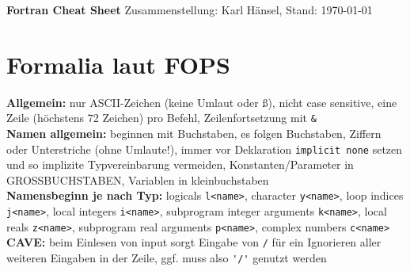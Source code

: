 \documentclass[a4paper, twocolumn]{scrarticle}
\begin{document}
  
  {\Huge \textbf{\textsf{Fortran Cheat Sheet}}}
  Zusammenstellung: Karl Hänsel, Stand: \today
  \section{Formalia laut FOPS}
  \textbf{Allgemein:} nur ASCII-Zeichen (keine Umlaut oder ß), nicht case sensitive, eine Zeile (höchstens 72 Zeichen) pro Befehl, Zeilenfortsetzung mit \lstinline|&|\\
 \textbf{ Namen allgemein:} beginnen mit Buchstaben, es folgen Buchstaben, Ziffern oder Unterstriche (ohne Umlaute!), immer vor Deklaration \lstinline|implicit none| setzen und so implizite Typvereinbarung vermeiden, Konstanten/Parameter in GROSSBUCHSTABEN, Variablen in kleinbuchstaben\\
 \textbf{Namensbeginn je nach Typ:} logicals \lstinline|l<name>|, character \lstinline|y<name>|, loop indices \lstinline|j<name>|, local integers \lstinline|i<name>|, subprogram integer arguments \lstinline|k<name>|, local reals \lstinline|z<name>|, subprogram real arguments \lstinline|p<name>|, complex numbers \lstinline|c<name>|\\
 \textbf{CAVE:} beim Einlesen von input sorgt Eingabe von \lstinline|/| für ein Ignorieren aller weiteren Eingaben in der Zeile, ggf. muss also \lstinline|'/'| genutzt werden
\end{document}
